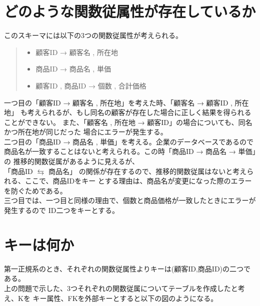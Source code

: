 \documentclass[dvipdfmx,autodetect-engine,titlepage]{jsarticle}
\begin{document}

\section{どのような関数従属性が存在しているか}

このスキーマには以下の3つの関数従属性が考えられる。

\begin{quote}
  \begin{itemize}
   \item 顧客ID → 顧客名 , 所在地
   \item 商品ID → 商品名 , 単価
   \item 顧客ID , 商品ID → 個数 , 合計価格
  \end{itemize}
 \end{quote}

 一つ目の「顧客ID → 顧客名 , 所在地」を考えた時、「顧客名 → 顧客ID , 所在地」
 も考えられるが、もし同名の顧客が存在した場合に正しく結果を得られることができない。
 また、「顧客名 , 所在地 → 顧客ID」の場合についても、同名かつ所在地が同じだった
 場合にエラーが発生する。\\
 二つ目の「商品ID → 商品名 , 単価」を考える。企業のデータベースであるので
 商品名が一致することはないと考えられる。この時「商品ID → 商品名 → 単価」の
 推移的関数従属があるように見えるが、\\「商品ID \begin{math}\leftrightarrows \end{math} 商品名」
 の関係が存在するので、推移的関数従属はないと考えられる、ここで、商品IDをキー
 とする理由は、商品名が変更になった際のエラーを防ぐためである。\\
 三つ目では、一つ目と同様の理由で、個数と商品価格が一致したときにエラーが発生するので
 ID二つをキーとする。

\section{キーは何か}

第一正規系のとき、それぞれの関数従属性よりキーは(顧客ID,商品ID)の二つである。\\

上の問題で示した、3つそれぞれの関数従属についてテーブルを作成したと考え、Kを
キー属性、FKを外部キーとすると以下の図のようになる。
\end{document}
